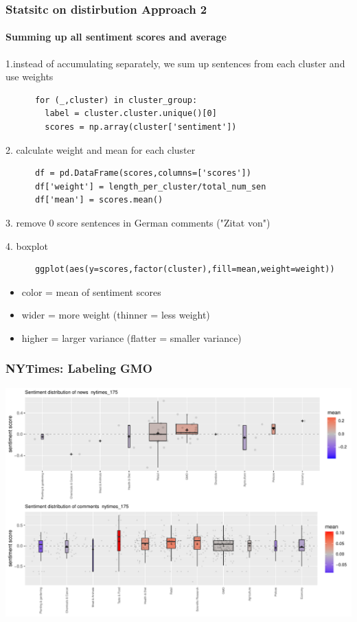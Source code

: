 \documentclass{tum-presentation}
\begin{document}
\begin{frame}[fragile]
  \frametitle{Statsitc on distirbution Approach 2}
  \framesubtitle{Summing up all sentiment scores and average}
  \begin{description}
    \large

    \item 1.instead of accumulating separately, we sum up sentences from each cluster and use weights
    \begin{lstlisting}
      for (_,cluster) in cluster_group:
        label = cluster.cluster.unique()[0]
        scores = np.array(cluster['sentiment'])
      \end{lstlisting}
      \item 2. calculate weight and mean for each cluster
      
      \begin{lstlisting}
      df = pd.DataFrame(scores,columns=['scores'])
      df['weight'] = length_per_cluster/total_num_sen
      df['mean'] = scores.mean()
    \end{lstlisting}
    \item 3. remove 0 score sentences in German comments ("Zitat von")
    \item 4. boxplot
    \begin{lstlisting}
      ggplot(aes(y=scores,factor(cluster),fill=mean,weight=weight))
    \end{lstlisting}

    \item  \begin{itemize}
      \item color = mean of sentiment scores
    \item wider = more weight (thinner = less weight)
    
    \item higher = larger variance (flatter = smaller 
    variance)
    \end{itemize}
  \end{description}
\end{frame}

\begin{frame}
  \frametitle{NYTimes: Labeling GMO}
  \includegraphics[width =0.65 \textwidth]{figures/boxplot_nytimes_175.pdf}
  
\end{frame}
\end{document}
